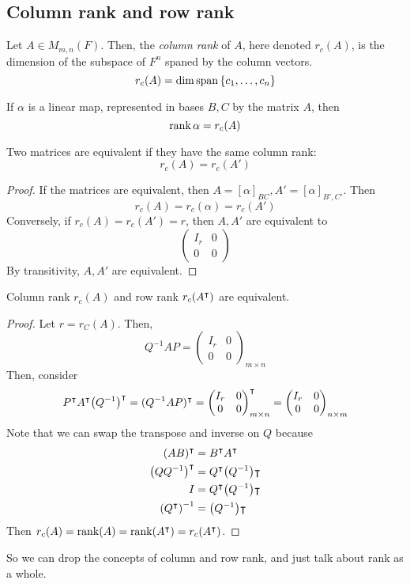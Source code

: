 \subsection{Column rank and row rank}
\begin{definition}
	Let \( A \in M_{m,n}(F) \).
	Then, the \textit{column rank} of \( A \), here denoted \( r_c(A) \), is the dimension of the subspace of \( F^n \) spaned by the column vectors.
	\[
		r_c(A) = \dim \operatorname{span} \qty{c_1, \dots, c_n}
	\]
\end{definition}
\begin{remark}
	If \( \alpha \) is a linear map, represented in bases \( B, C \) by the matrix \( A \), then
	\[
		\rank \alpha = r_c(A)
	\]
\end{remark}
\begin{proposition}
	Two matrices are equivalent if they have the same column rank:
	\[
		r_c(A) = r_c(A')
	\]
\end{proposition}
\begin{proof}
	If the matrices are equivalent, then \( A = [\alpha]_{BC}, A' = [\alpha]_{B',C'} \).
	Then
	\[
		r_c(A) = r_c(\alpha) = r_c(A')
	\]
	Conversely, if \( r_c(A) = r_c(A') = r \), then \( A, A' \) are equivalent to
	\[
		\begin{pmatrix}
			I_r & 0 \\
			0   & 0
		\end{pmatrix}
	\]
	By transitivity, \( A, A' \) are equivalent.
\end{proof}
\begin{theorem}
	Column rank \( r_c(A) \) and row rank \( r_c(A^\intercal) \) are equivalent.
\end{theorem}
\begin{proof}
	Let \( r = r_C(A) \).
	Then,
	\[
		Q^{-1}AP = \begin{pmatrix}
			I_r & 0 \\
			0   & 0
		\end{pmatrix}_{m \times n}
	\]
	Then, consider
	\[
		P^\intercal A^\intercal \qty(Q^{-1})^\intercal = (Q^{-1}AP)^\intercal = \begin{pmatrix}
			I_r & 0 \\
			0   & 0
		\end{pmatrix}_{m \times n}^\intercal = \begin{pmatrix}
			I_r & 0 \\
			0   & 0
		\end{pmatrix}_{n \times m}
	\]
	Note that we can swap the transpose and inverse on \( Q \) because
	\begin{align*}
		(AB)^\intercal          & = B^\intercal A^\intercal           \\
		\qty(QQ^{-1})^\intercal & = Q^\intercal \qty(Q^{-1})\intercal \\
		I                        & = Q^\intercal \qty(Q^{-1})\intercal \\
		\qty(Q^\intercal)^{-1}  & = \qty(Q^{-1})\intercal
	\end{align*}
	Then \( r_c(A) = \rank(A) = \rank(A^\intercal) = r_c(A^\intercal) \).
\end{proof}
\noindent So we can drop the concepts of column and row rank, and just talk about rank as a whole.

